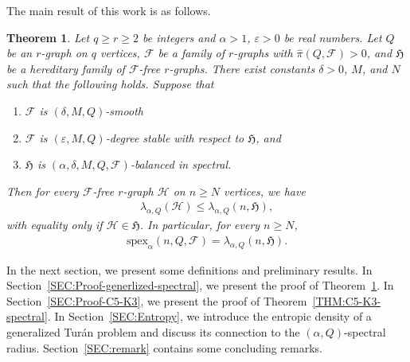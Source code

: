 \documentclass[11pt,a4paper]{article}
\newtheorem{theorem}[definition]{Theorem}
\begin{document}
The main result of this work is as follows. 
%
\begin{theorem}\label{THM:generalized-spectral}
    Let $q \ge r \ge 2$ be integers and $\alpha > 1$, $\varepsilon > 0$ be real numbers.
    Let $Q$ be an $r$-graph on $q$ vertices, $\mathcal{F}$ be a family of $r$-graphs with $\hat{\pi}(Q, \mathcal{F}) > 0$, and $\mathfrak{H}$ be a hereditary family of $\mathcal{F}$-free $r$-graphs. 
    There exist constants $\delta > 0$, $M$, and $N$ such that the following holds.
    Suppose that 
    \begin{enumerate}[label=(\roman*)]
        \item\label{THM:generalized-spectral-a} $\mathcal{F}$ is $(\delta, M, Q)$-smooth
        \item\label{THM:generalized-spectral-b} $\mathcal{F}$ is $(\varepsilon, M, Q)$-degree stable with respect to $\mathfrak{H}$, and 
        \item\label{THM:generalized-spectral-c} $\mathfrak{H}$ is $(\alpha, \delta, M, Q, \mathcal{F})$-balanced in spectral. 
    \end{enumerate}
    Then for every $\mathcal{F}$-free $r$-graph $\mathcal{H}$ on $n \ge N$ vertices, we have 
    \begin{align*}
        \lambda_{\alpha, Q}(\mathcal{H})
        \le \lambda_{\alpha, Q}(n, \mathfrak{H}), 
    \end{align*}
    with equality only if $\mathcal{H} \in \mathfrak{H}$.
    In particular, for every $n \ge N$, 
    \begin{align*}
        \mathrm{spex}_{\alpha}(n, Q, \mathcal{F})
        = \lambda_{\alpha, Q}(n, \mathfrak{H}). 
    \end{align*}
\end{theorem}

In the next section, we present some definitions and preliminary results. 
In Section~\ref{SEC:Proof-generlized-spectral}, we present the proof of Theorem~\ref{THM:generalized-spectral}. 
In Section~\ref{SEC:Proof-C5-K3}, we present the proof of Theorem~\ref{THM:C5-K3-spectral}. 
In Section~\ref{SEC:Entropy}, we introduce the entropic density of a generalized Tur\'{a}n problem and discuss its connection to the $(\alpha, Q)$-spectral radius. 
Section~\ref{SEC:remark} contains some concluding remarks. 

\end{document}
